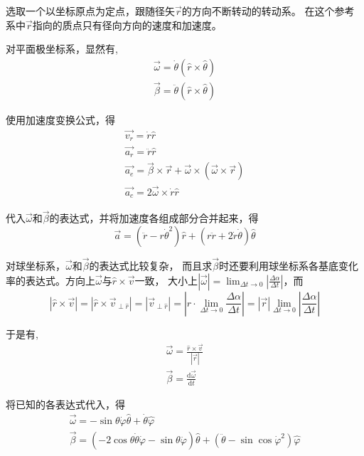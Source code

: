 \documentclass{ctexart}
\begin{document}
    选取一个以坐标原点为定点，跟随径矢$\vec{r}$的方向不断转动的转动系。
    在这个参考系中$\vec{r}$指向的质点只有径向方向的速度和加速度。

    对平面极坐标系，显然有,
    \begin{gather*}
        \vec{\omega} = \dot{\theta}(\hat{r}\times\hat{\theta}) \\
        \vec{\beta} = \ddot{\theta}(\hat{r}\times\hat{\theta})
    \end{gather*}

    使用加速度变换公式，得
    \begin{gather}
        \vec{v_r} = \dot{r}\hat{r} \label{eq:1} \\
        \vec{a_r} = \ddot{r}\hat{r} \label{eq:2} \\
        \vec{a_e} = \vec{\beta}\times\vec{r}+\vec{\omega}\times(\vec{\omega}\times\vec{r})
        \label{eq:3} \\
        \vec{a_c} = 2\vec{\omega}\times\dot{r}\hat{r} \label{eq:4}
    \end{gather}

    代入$\vec{\omega}$和$\vec{\beta}$的表达式，并将加速度各组成部分合并起来，得
    \begin{equation*}
        \vec{a} = (\ddot{r}-r\dot{\theta}^2)\hat{r}+(r\ddot{r}+2\dot{r}\dot{\theta})\hat{\theta}
    \end{equation*}

    对球坐标系，$\vec{\omega}$和$\vec{\beta}$的表达式比较复杂，
    而且求$\vec{\beta}$时还要利用球坐标系各基底变化率的表达式。方向上$\vec{\omega}$与$\hat{r}\times\vec{v}$一致，
    大小上$|\vec{\omega}| = \lim_{\Delta t \to 0}|\frac{\Delta\alpha}{\Delta t}|$，而
    \begin{equation*}
        |\hat{r}\times\vec{v}| = |\hat{r}\times\vec{v}_{\text{$\perp\hat{r}$}}| =
        |\vec{v}_{\text{$\perp\hat{r}$}}| =
        |r\cdot\lim_{\Delta t \to 0}\frac{\Delta\alpha}{\Delta t}| =
        |\vec{r}|\lim_{\Delta t \to 0}|\frac{\Delta\alpha}{\Delta t}|
    \end{equation*}

    于是有,
    \begin{gather*}
        \vec{\omega} = \frac{\hat{r}\times\vec{v}}{|\vec{r}|} \\
        \vec{\beta} = \frac{\mathrm{d}\vec{\omega}}{\mathrm{d}t}
    \end{gather*}

    将已知的各表达式代入，得
    \begin{gather*}
        \vec{\omega} = -\sin\theta\dot{\varphi}\hat{\theta}+\dot{\theta}\hat{\varphi} \\
        \vec{\beta} = (-2\cos\theta\dot{\theta}\dot{\varphi}-\sin\theta\ddot{\varphi})\hat{\theta}+
        (\ddot{\theta}-\sin\cos\dot{\varphi}^2)\hat{\varphi}
    \end{gather*}
\end{document}
